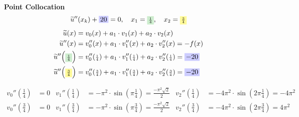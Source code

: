 \documentclass[
final,
a4paper,
oneside,
parskip=full,
headings=standardclasses,
headings=big,
pointednumbers,
fleqn
]{scrartcl}
\newcommand{\tfillb}[1]{\tfillc[#1][blue!20]}
\newcommand{\tfillg}[1]{\tfillc[#1][Green!20]}
\newcommand{\tfilly}[1]{\tfillc[#1][yellow!40]}
\newcommand{\fs}[2]{{\scriptstyle\frac{#1}{#2}}}
\newcommand{\kl}[1]{{\left( #1 \right)}}
\begin{document}
    {\bf{Point Collocation}} \\
    {\setlength{\abovedisplayskip}{-6pt}
    \setlength{\belowdisplayskip}{-12pt}
    \begin{align*}
        \widetilde{u}''\kl{x_k} + \tfillb{$20$} = 0, \quad x_1 = \tfillg{$\fs{1}{4}$}, \quad x_2 = \tfilly{$\fs{3}{4}$}
    \end{align*}}
    {\setlength{\abovedisplayskip}{6pt}
    \setlength{\belowdisplayskip}{-12pt}
    \begin{align*}
        \widetilde{u}\kl{x}   &= v_0\kl{x}   + a_1 \cdot v_1\kl{x}   + a_2 \cdot v_2\kl{x} \\
        \widetilde{u}''\kl{x} &= v_0''\kl{x} + a_1 \cdot v_1''\kl{x} + a_2 \cdot v_2''\kl{x} = -f\kl{x} \\
        \widetilde{u}''\kl{\tfillg{$\fs{1}{4}$}} &= v_0''\kl{\fs{1}{4}} + a_1 \cdot v_1''\kl{\fs{1}{4}} + a_2 \cdot v_2''\kl{\fs{1}{4}} = \tfillb{$-20$} \\
        \widetilde{u}''\kl{\tfilly{$\fs{3}{4}$}} &= v_0''\kl{\fs{3}{4}} + a_1 \cdot v_1''\kl{\fs{3}{4}} + a_2 \cdot v_2''\kl{\fs{3}{4}} = \tfillb{$-20$} \\
    \end{align*}}
    \begin{minipage}{0.8\textwidth}
        \setlength{\abovedisplayskip}{-6pt}
        \setlength{\belowdisplayskip}{-12pt}
        \begin{align*}
        v_0''\kl{\fs{1}{4}} &= 0 &
        v_1''\kl{\fs{1}{4}} &= -\pi^2 \cdot \sin\kl{\pi \fs{1}{4}} = \fs{-\pi^2 \sqrt{2}}{2} &
        v_2''\kl{\fs{1}{4}} &= -4 \pi^2 \cdot \sin\kl{2 \pi \fs{1}{4}} = -4\pi^2\\
        v_0''\kl{\fs{3}{4}} &= 0 &
        v_1''\kl{\fs{3}{4}} &= -\pi^2 \cdot \sin\kl{\pi \fs{3}{4}} = \fs{-\pi^2 \sqrt{2}}{2} &
        v_2''\kl{\fs{3}{4}} &= -4 \pi^2 \cdot \sin\kl{2 \pi \fs{3}{4}} = 4\pi^2\\
        \end{align*}
    \end{minipage}
\end{document}
